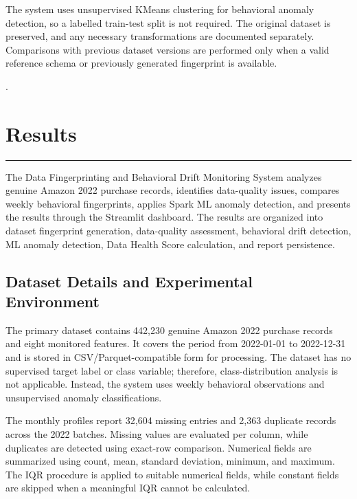 \documentclass[12pt,a4paper]{report}
\begin{document}
The system uses unsupervised KMeans clustering for behavioral anomaly detection, so a labelled train-test split is not required. The original dataset is preserved, and any necessary transformations are documented separately. Comparisons with previous dataset versions are performed only when a valid reference schema or previously generated fingerprint is available.

.




\chapter{Results}
\rule{\textwidth}{2pt}


The Data Fingerprinting and Behavioral Drift Monitoring System analyzes genuine Amazon 2022 purchase records, identifies data-quality issues, compares weekly behavioral fingerprints, applies Spark ML anomaly detection, and presents the results through the Streamlit dashboard. The results are organized into dataset fingerprint generation, data-quality assessment, behavioral drift detection, ML anomaly detection, Data Health Score calculation, and report persistence.


\clearpage

\clearpage
\section{Dataset Details and Experimental Environment}

The primary dataset contains 442,230 genuine Amazon 2022 purchase records and eight monitored features. It covers the period from 2022-01-01 to 2022-12-31 and is stored in CSV/Parquet-compatible form for processing. The dataset has no supervised target label or class variable; therefore, class-distribution analysis is not applicable. Instead, the system uses weekly behavioral observations and unsupervised anomaly classifications.

The monthly profiles report 32,604 missing entries and 2,363 duplicate records across the 2022 batches. Missing values are evaluated per column, while duplicates are detected using exact-row comparison. Numerical fields are summarized using count, mean, standard deviation, minimum, and maximum. The IQR procedure is applied to suitable numerical fields, while constant fields are skipped when a meaningful IQR cannot be calculated.
\end{document}
